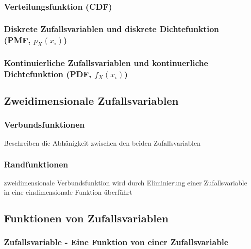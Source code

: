 \subsubsection{Verteilungsfunktion (CDF) }
\subsubsection{Diskrete Zufallsvariablen und diskrete Dichtefunktion (PMF, $p_X(x_i)$) }
\subsubsection{Kontinuierliche Zufallsvariablen und kontinuerliche Dichtefunktion (PDF, $f_X(x_i)$) }
\vspace{0.25cm}

\subsection{Zweidimensionale Zufallsvariablen }

\subsubsection{Verbundsfunktionen }
\vspace{-0.2cm}
\hspace*{0.2cm} Beschreiben die Abhänigkeit zwischen den beiden Zufallsvariablen
\vspace{-0.2cm}
\subsubsection{Randfunktionen }
\vspace{-0.2cm}
\hspace*{0.2cm} zweidimensionale Verbundsfunktion wird durch Eliminierung einer Zufallsvariable in eine eindimensionale Funktion überführt
\vspace{-0.5cm}

\subsection{Funktionen von Zufallsvariablen }
\subsubsection{Zufallsvariable - Eine Funktion von einer Zufallsvariable}
